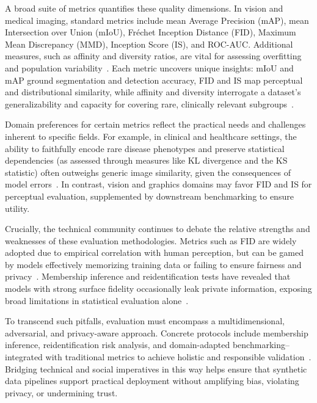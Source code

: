 \documentclass[sigconf]{acmart}
\begin{document}
A broad suite of metrics quantifies these quality dimensions. In vision and medical imaging, standard metrics include mean Average Precision (mAP), mean Intersection over Union (mIoU), Fréchet Inception Distance (FID), Maximum Mean Discrepancy (MMD), Inception Score (IS), and ROC-AUC. Additional measures, such as affinity and diversity ratios, are vital for assessing overfitting and population variability~\cite{ref1}\cite{ref2}\cite{ref3}\cite{ref12}\cite{ref14}\cite{ref15}\cite{ref18}\cite{ref21}\cite{ref22}\cite{ref24}\cite{ref31}\cite{ref34}\cite{ref43}\cite{ref60}\cite{ref64}\cite{ref68}\cite{ref88}\cite{ref90}\cite{ref93}\cite{ref95}\cite{ref101}\cite{ref102}. Each metric uncovers unique insights: mIoU and mAP ground segmentation and detection accuracy, FID and IS map perceptual and distributional similarity, while affinity and diversity interrogate a dataset's generalizability and capacity for covering rare, clinically relevant subgroups~\cite{ref64}.

Domain preferences for certain metrics reflect the practical needs and challenges inherent to specific fields. For example, in clinical and healthcare settings, the ability to faithfully encode rare disease phenotypes and preserve statistical dependencies (as assessed through measures like KL divergence and the KS statistic) often outweighs generic image similarity, given the consequences of model errors~\cite{ref1}\cite{ref2}\cite{ref87}\cite{ref88}\cite{ref89}. In contrast, vision and graphics domains may favor FID and IS for perceptual evaluation, supplemented by downstream benchmarking to ensure utility.

Crucially, the technical community continues to debate the relative strengths and weaknesses of these evaluation methodologies. Metrics such as FID are widely adopted due to empirical correlation with human perception, but can be gamed by models effectively memorizing training data or failing to ensure fairness and privacy~\cite{ref21}\cite{ref87}. Membership inference and reidentification tests have revealed that models with strong surface fidelity occasionally leak private information, exposing broad limitations in statistical evaluation alone~\cite{ref21}\cite{ref3}.

To transcend such pitfalls, evaluation must encompass a multidimensional, adversarial, and privacy-aware approach. Concrete protocols include membership inference, reidentification risk analysis, and domain-adapted benchmarking--integrated with traditional metrics to achieve holistic and responsible validation~\cite{ref87}\cite{ref88}\cite{ref89}\cite{ref3}. Bridging technical and social imperatives in this way helps ensure that synthetic data pipelines support practical deployment without amplifying bias, violating privacy, or undermining trust.
\end{document}
